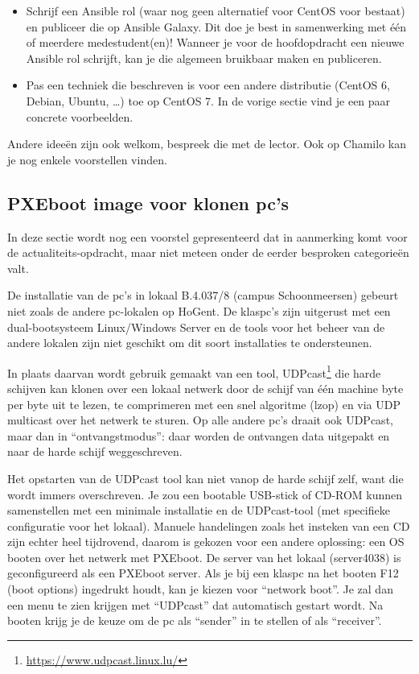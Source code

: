 \begin{itemize}
\item Schrijf een Ansible rol (waar nog geen alternatief voor CentOS voor bestaat) en publiceer die op Ansible Galaxy. Dit doe je best in samenwerking met één of meerdere medestudent(en)! Wanneer je voor de hoofdopdracht een nieuwe Ansible rol schrijft, kan je die algemeen bruikbaar maken en publiceren.
\item Pas een techniek die beschreven is voor een andere distributie (CentOS 6, Debian, Ubuntu, \ldots{}) toe op CentOS 7. In de vorige sectie vind je een paar concrete voorbeelden.
\end{itemize}

Andere ideeën zijn ook welkom, bespreek die met de lector. Ook op Chamilo kan je nog enkele voorstellen vinden.

\subsection{PXEboot image voor klonen pc's}
\label{subs:pxeboot_image_voor_klonen_pc_s}

In deze sectie wordt nog een voorstel gepresenteerd dat in aanmerking komt voor de actualiteits-opdracht, maar niet meteen onder de eerder besproken categorieën valt.

De installatie van de pc's in lokaal B.4.037/8 (campus Schoonmeersen) gebeurt niet zoals de andere pc-lokalen op HoGent. De klaspc's zijn uitgerust met een dual-bootsysteem Linux/Windows Server en de tools voor het beheer van de andere lokalen zijn niet geschikt om dit soort installaties te ondersteunen.

In plaats daarvan wordt gebruik gemaakt van een tool, UDPcast\footnote{\url{https://www.udpcast.linux.lu/}} die harde schijven kan klonen over een lokaal netwerk door de schijf van één machine byte per byte uit te lezen, te comprimeren met een snel algoritme (lzop) en via UDP multicast over het netwerk te sturen. Op alle andere pc's draait ook UDPcast, maar dan in ``ontvangstmodus'': daar worden de ontvangen data uitgepakt en naar de harde schijf weggeschreven.

Het opstarten van de UDPcast tool kan niet vanop de harde schijf zelf, want die wordt immers overschreven. Je zou een bootable USB-stick of CD-ROM kunnen samenstellen met een minimale installatie en de UDPcast-tool (met specifieke configuratie voor het lokaal). Manuele handelingen zoals het insteken van een CD zijn echter heel tijdrovend, daarom is gekozen voor een andere oplossing: een OS booten over het netwerk met PXEboot. De server van het lokaal (server4038) is geconfigureerd als een PXEboot server. Als je bij een klaspc na het booten F12 (boot options) ingedrukt houdt, kan je kiezen voor ``network boot''. Je zal dan een menu te zien krijgen met ``UDPcast'' dat automatisch gestart wordt. Na booten krijg je de keuze om de pc als ``sender'' in te stellen of als ``receiver''.

